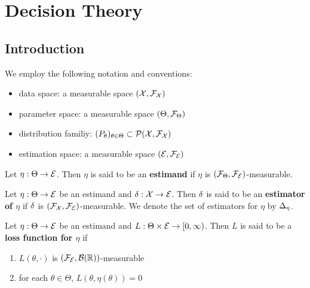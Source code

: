 \documentclass{book}
\begin{document}
	
	
	
	
	
	
	
	
	
	
	
	
	
	
	
	
	
	
	
	
	
	
	
		\newpage
	\section{Decision Theory}
	
	\subsection{Introduction}
	
	\begin{note} We employ the following notation and conventions:
		\begin{itemize}
			\item data space: a measurable space $(\mathcal{X}, \mathcal{F}_{\mathcal{X}})$
			\item parameter space: a measurable space $(\Theta, \mathcal{F}_{\Theta})$
			\item distribution familiy: $(P_{\theta})_{\theta \in \Theta} \subset \mathcal{P}(\mathcal{X}, \mathcal{F}_{\mathcal{X}})$
			\item estimation space: a measurable space $(\mathcal{E}, \mathcal{F}_{\mathcal{E}})$
		\end{itemize}
	\end{note}

	\begin{defn}
		Let $\eta: \Theta \rightarrow \mathcal{E}$. Then $\eta$ is said to be an \textbf{estimand} if $\eta$ is $(\mathcal{F}_{\Theta}, \mathcal{F}_{\mathcal{E}})$-measurable. 
	\end{defn}
	
	\begin{defn}
		Let $\eta: \Theta \rightarrow \mathcal{E}$ be an estimand and $\delta: \mathcal{X} \rightarrow \mathcal{E}$. Then $\delta$ is said to be an \textbf{estimator of $\eta$} if $\delta$ is $(\mathcal{F}_{\mathcal{X}}, \mathcal{F}_{\mathcal{E}})$-measurable. We denote the set of estimators for $\eta$ by $\Delta_{\eta}$.
	\end{defn}
	
	\begin{defn}
		Let $\eta: \Theta \rightarrow \mathcal{E}$ be an estimand and $L: \Theta \times \mathcal{E} \rightarrow [0,\infty)$. Then $L$ is said to be a \textbf{loss function for $\eta$} if 
		\begin{enumerate}
			\item $L(\theta, \cdot)$ is $(\mathcal{F}_{\mathcal{E}}, \mathcal{B}(\mathbb{R}))$-measurable
			\item for each $\theta \in \Theta$, $L(\theta, \eta(\theta)) = 0 $
		\end{enumerate}
	\end{defn}
	
\end{document}
